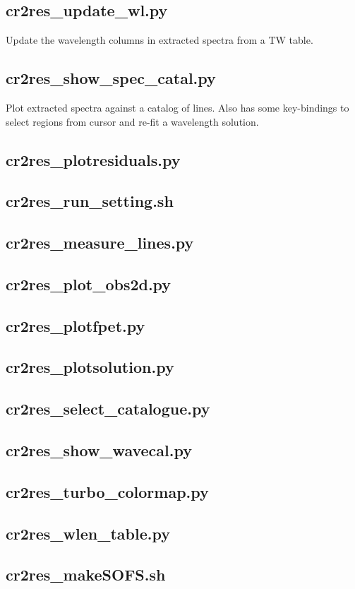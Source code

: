 \subsection{cr2res\_update\_wl.py}
Update the wavelength columns in extracted spectra from a TW table.

\subsection{cr2res\_show\_spec\_catal.py}
Plot extracted spectra against a catalog of lines. Also has some key-bindings
to select regions from cursor and re-fit a wavelength solution.

\subsection{cr2res\_plotresiduals.py}


\subsection{cr2res\_run\_setting.sh}
\subsection{cr2res\_measure\_lines.py}
\subsection{cr2res\_plot\_obs2d.py}
\subsection{cr2res\_plotfpet.py}
\subsection{cr2res\_plotsolution.py}
\subsection{cr2res\_select\_catalogue.py}
\subsection{cr2res\_show\_wavecal.py}
\subsection{cr2res\_turbo\_colormap.py}
\subsection{cr2res\_wlen\_table.py}
\subsection{cr2res\_makeSOFS.sh}

